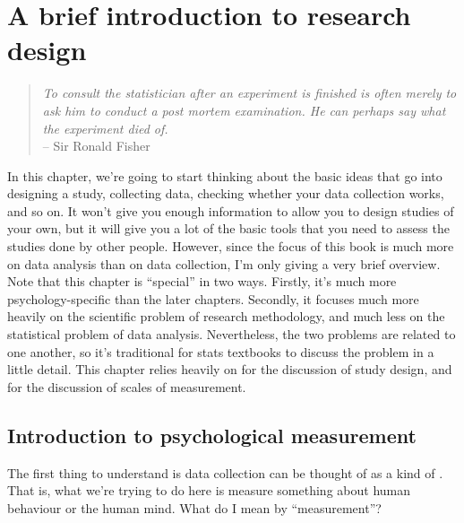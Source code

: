 

\chapter{A brief introduction to research design\label{ch:studydesign}}

\begin{quote}
{\it To consult the statistician after an experiment is finished is often merely to ask him to conduct a post mortem examination. He can perhaps say what the experiment died of.} \\
\hspace*{2cm} -- Sir Ronald Fisher
\end{quote}

In this chapter, we're going to start thinking about the basic ideas that go into designing a study, collecting data, checking whether your data collection works, and so on. It won't give you enough information to allow you to design studies of your own, but it will give you a lot of the basic tools that you need to assess the studies done by other people. However, since the focus of this book is much more on data analysis than on data collection, I'm only giving a very brief overview. Note that this chapter is ``special'' in two ways. Firstly, it's much more psychology-specific than the later chapters. Secondly, it focuses much more heavily on the scientific problem of research methodology, and much less on the statistical problem of data analysis. Nevertheless, the two problems are related to one another, so it's traditional for stats textbooks to discuss the problem in a little detail. This chapter relies heavily on \textcite{Campbell1963} for the discussion of study design, and \textcite{Stevens1946} for the discussion of scales of measurement. 

\section{Introduction to psychological measurement~\label{sec:measurement}}

The first thing to understand is data collection can be thought of as a kind of . That is, what we're trying to do here is measure something about human behaviour or the human mind. What do I mean by ``measurement''? 

